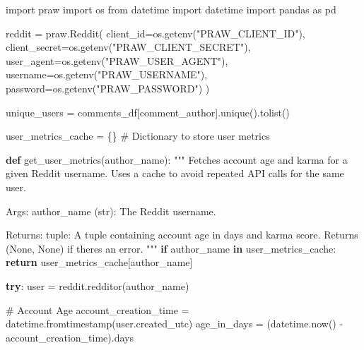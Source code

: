 \documentclass[
  12pt,
  letterpaper,
  DIV=11,
  numbers=noendperiod]{scrartcl}
\newenvironment{Shaded}{\begin{snugshade}}{\end{snugshade}}
\newcommand{\CommentTok}[1]{\textcolor[rgb]{0.37,0.37,0.37}{#1}}
\newcommand{\ControlFlowTok}[1]{\textcolor[rgb]{0.00,0.23,0.31}{\textbf{#1}}}
\newcommand{\ImportTok}[1]{\textcolor[rgb]{0.00,0.46,0.62}{#1}}
\newcommand{\KeywordTok}[1]{\textcolor[rgb]{0.00,0.23,0.31}{\textbf{#1}}}
\newcommand{\NormalTok}[1]{\textcolor[rgb]{0.00,0.23,0.31}{#1}}
\newcommand{\OperatorTok}[1]{\textcolor[rgb]{0.37,0.37,0.37}{#1}}
\newcommand{\StringTok}[1]{\textcolor[rgb]{0.13,0.47,0.30}{#1}}
\begin{document}
\begin{Shaded}
\begin{Highlighting}[]
\ImportTok{import}\NormalTok{ praw}
\ImportTok{import}\NormalTok{ os}
\ImportTok{from}\NormalTok{ datetime }\ImportTok{import}\NormalTok{ datetime}
\ImportTok{import}\NormalTok{ pandas }\ImportTok{as}\NormalTok{ pd}

\NormalTok{reddit }\OperatorTok{=}\NormalTok{ praw.Reddit(}
\NormalTok{    client\_id}\OperatorTok{=}\NormalTok{os.getenv(}\StringTok{"PRAW\_CLIENT\_ID"}\NormalTok{),}
\NormalTok{    client\_secret}\OperatorTok{=}\NormalTok{os.getenv(}\StringTok{"PRAW\_CLIENT\_SECRET"}\NormalTok{),}
\NormalTok{    user\_agent}\OperatorTok{=}\NormalTok{os.getenv(}\StringTok{"PRAW\_USER\_AGENT"}\NormalTok{),}
\NormalTok{    username}\OperatorTok{=}\NormalTok{os.getenv(}\StringTok{"PRAW\_USERNAME"}\NormalTok{),}
\NormalTok{    password}\OperatorTok{=}\NormalTok{os.getenv(}\StringTok{"PRAW\_PASSWORD"}\NormalTok{)}
\NormalTok{)}

\NormalTok{unique\_users }\OperatorTok{=}\NormalTok{ comments\_df[}\StringTok{\textquotesingle{}comment\_author\textquotesingle{}}\NormalTok{].unique().tolist()}

\NormalTok{user\_metrics\_cache }\OperatorTok{=}\NormalTok{ \{\}  }\CommentTok{\# Dictionary to store user metrics}

\KeywordTok{def}\NormalTok{ get\_user\_metrics(author\_name):}
    \CommentTok{"""}
\CommentTok{    Fetches account age and karma for a given Reddit username.}
\CommentTok{    Uses a cache to avoid repeated API calls for the same user.}

\CommentTok{    Args:}
\CommentTok{        author\_name (str): The Reddit username.}

\CommentTok{    Returns:}
\CommentTok{        tuple: A tuple containing account age in days and karma score.}
\CommentTok{               Returns (None, None) if there\textquotesingle{}s an error.}
\CommentTok{    """}
    \ControlFlowTok{if}\NormalTok{ author\_name }\KeywordTok{in}\NormalTok{ user\_metrics\_cache:}
        \ControlFlowTok{return}\NormalTok{ user\_metrics\_cache[author\_name]}

    \ControlFlowTok{try}\NormalTok{:}
\NormalTok{        user }\OperatorTok{=}\NormalTok{ reddit.redditor(author\_name)}

        \CommentTok{\# Account Age}
\NormalTok{        account\_creation\_time }\OperatorTok{=}\NormalTok{ datetime.fromtimestamp(user.created\_utc)}
\NormalTok{        age\_in\_days }\OperatorTok{=}\NormalTok{ (datetime.now() }\OperatorTok{{-}}\NormalTok{ account\_creation\_time).days}


\end{Highlighting}
\end{Shaded}
\end{document}
